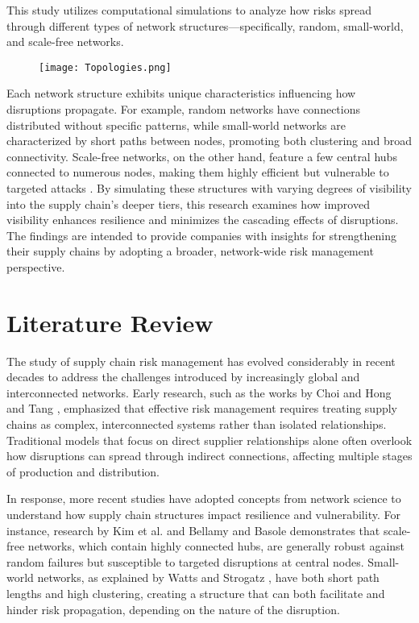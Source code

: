 \documentclass{article}
\begin{document}
This study utilizes computational simulations to analyze how risks spread through different types of network structures—specifically, random, small-world, and scale-free networks.

\begin{figure}[h]
  \centering
  \texttt{[image: Topologies.png]}
  \caption{}
  \label{fig:figure1}
\end{figure}

Each network structure exhibits unique characteristics influencing how disruptions propagate. For example, random networks have connections distributed without specific patterns, while small-world networks are characterized by short paths between nodes, promoting both clustering and broad connectivity. Scale-free networks, on the other hand, feature a few central hubs connected to numerous nodes, making them highly efficient but vulnerable to targeted attacks \cite{Watts1998, Barabasi2002}. By simulating these structures with varying degrees of visibility into the supply chain’s deeper tiers, this research examines how improved visibility enhances resilience and minimizes the cascading effects of disruptions. The findings are intended to provide companies with insights for strengthening their supply chains by adopting a broader, network-wide risk management perspective.


\section{Literature Review}
The study of supply chain risk management has evolved considerably in recent decades to address the challenges introduced by increasingly global and interconnected networks. Early research, such as the works by Choi and Hong \cite{Choi2001} and Tang \cite{Tang2006}, emphasized that effective risk management requires treating supply chains as complex, interconnected systems rather than isolated relationships. Traditional models that focus on direct supplier relationships alone often overlook how disruptions can spread through indirect connections, affecting multiple stages of production and distribution.

In response, more recent studies have adopted concepts from network science to understand how supply chain structures impact resilience and vulnerability. For instance, research by Kim et al. \cite{Kim2011} and Bellamy and Basole \cite{Bellamy2013} demonstrates that scale-free networks, which contain highly connected hubs, are generally robust against random failures but susceptible to targeted disruptions at central nodes. Small-world networks, as explained by Watts and Strogatz \cite{Watts1998}, have both short path lengths and high clustering, creating a structure that can both facilitate and hinder risk propagation, depending on the nature of the disruption.
\end{document}
